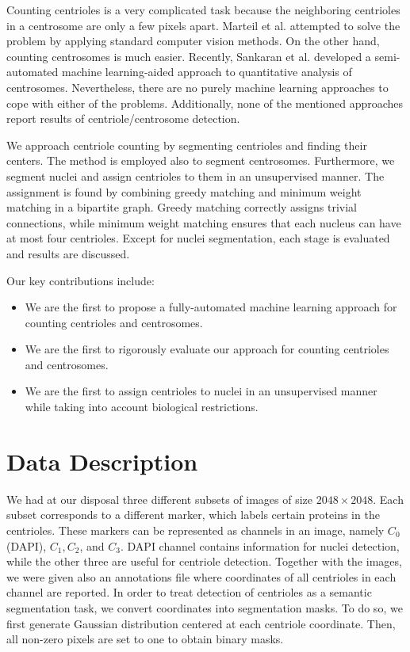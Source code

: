 \documentclass[9pt,conference,compsocconf, article]{IEEEtran}
\begin{document}
Counting centrioles is a very complicated task because the neighboring centrioles in a centrosome are only a few pixels apart. Marteil et al. \cite{marteil2018over} attempted to solve the problem by applying standard computer vision methods. On the other hand, counting centrosomes is much easier. Recently, Sankaran et al. \cite{sankaran2020semi} developed a semi-automated machine learning-aided approach to quantitative analysis of centrosomes. Nevertheless, there are no purely machine learning approaches to cope with either of the problems. Additionally, none of the mentioned approaches report results of centriole/centrosome detection. 

We approach centriole counting by segmenting centrioles and finding their centers. The method is employed also to segment centrosomes. Furthermore, we segment nuclei and assign centrioles to them in an unsupervised manner. The assignment is found by combining greedy matching and minimum weight matching in a bipartite graph. Greedy matching correctly assigns trivial connections, while minimum weight matching ensures that each nucleus can have at most four centrioles. Except for nuclei segmentation, each stage is evaluated and results are discussed. 

Our key contributions include: 
\begin{itemize}
    \item We are the first to propose a fully-automated machine learning approach for counting centrioles and centrosomes.
    \item We are the first to rigorously evaluate our approach for counting centrioles and centrosomes.
    \item We are the first to assign centrioles to nuclei in an unsupervised manner while taking into account biological restrictions.
\end{itemize}

\section{Data Description}
\label{data-description}

We had at our disposal three different subsets of images of size $2048 \times 2048$. Each subset corresponds to a different marker, which labels certain proteins in the centrioles. These markers can be represented as channels in an image, namely $C_0$ (DAPI), $C_1, C_2$, and $C_3$. DAPI channel contains information for nuclei detection, while the other three are useful for centriole detection. Together with the images, we were given also an annotations file where coordinates of all centrioles in each channel are reported. In order to treat detection of centrioles as a semantic segmentation task, we convert coordinates into segmentation masks. To do so, we first generate Gaussian distribution centered at each centriole coordinate. Then, all non-zero pixels are set to one to obtain binary masks.
\end{document}
